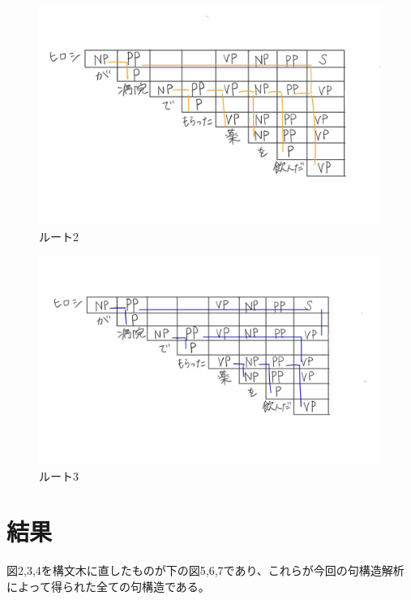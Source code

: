 \documentclass[dvipdfmx,autodetect-engine,titlepage]{jsarticle}
\begin{document}
 \begin{figure}[H]
    \centering
    \includegraphics[scale=0.17]{s3.jpg}
    \caption{ルート2}\label{fig:図}
\end{figure}

 \begin{figure}[H]
    \centering
    \includegraphics[scale=0.17]{s4.jpg}
    \caption{ルート3}\label{fig:図}
\end{figure}

\section{結果}
図2,3,4を構文木に直したものが下の図5,6,7であり、これらが今回の句構造解析によって得られた全ての句構造である。\\
\end{document}
